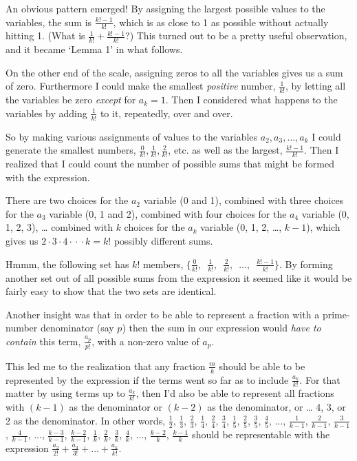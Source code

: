 \documentclass{article}
\begin{document}
An obvious pattern emerged!
By assigning the largest possible values to the variables,
the sum is \(\frac{k!-1}{k!}\),
which is as close to 1 as possible without actually
hitting 1. (What is \(\frac{1}{k!} + \frac{k!-1}{k!}\)?)
This turned out to be
a pretty useful observation, and it became `Lemma 1' in what follows.

On the other end of the scale, assigning zeros to all the variables 
gives us a sum of zero.
Furthermore
I could make
the smallest \emph{positive} number, \(\frac{1}{k!}\), by
letting all the variables be zero \emph{except} for \(a_k = 1\).
Then I considered what happens to the variables by
adding \(\frac{1}{k!}\) to it, repeatedly, over and over.

So by making various assignments of values to
the variables \(a_2, a_3, \dots{}, a_k\) I could
generate the smallest numbers, \(\frac{0}{k!}, \frac{1}{k!}, \frac{2}{k!}\), etc.
as well as the largest,
\(\frac{k!-1}{k!}\).
Then I realized that I could count the number of possible sums that might be formed 
with the expression.

There are two choices for the \(a_2\) variable (0 and 1),
combined with three choices for the \(a_3\) variable (0, 1 and 2),
combined with four choices for the \(a_4\) variable (0, 1, 2, 3),
\dots{} combined with \(k\) choices for
the \(a_k\) variable (0, 1, 2, \dots{}, \(k\!-\!1\)), which
gives us \(2\cdot{}3\cdot{}4\cdot{}\cdot{}\cdot{}k = k!\) possibly different sums.

Hmmm, the following set has \(k!\) members,
\(\{\frac{0}{k!},\enspace \frac{1}{k!},\enspace \frac{2}{k!},
\enspace \dots{},\enspace \frac{k!-1}{k!}\}\).
By forming another set out of all possible sums from the expression
it seemed like it would be fairly easy to show that the two sets are identical.

Another insight was that in order to be able to represent
a fraction with a prime-number denominator (say \(p\))
then the sum in our
expression would \emph{have to contain} this term,
\(\frac{a_p}{p!}\),
with a non-zero value of \(a_p\).

This led me to the realization that any fraction \(\frac{m}{k}\)
should be able to be represented by the expression
if the terms went so far as to include \(\frac{a_k}{k!}\). For that
matter by using terms up to \(\frac{a_k}{k!}\), then I'd
also be able to represent all fractions with
\((k-1)\) as the denominator or 
\((k-2)\) as the denominator, or \dots{}
4, 3, or 2 as the denominator. In other words,
\(\frac{1}{2}\),
\(\frac{1}{3}\),
\(\frac{2}{3}\),
\(\frac{1}{4}\),
\(\frac{2}{4}\),
\(\frac{3}{4}\),
\(\frac{1}{5}\),
\(\frac{2}{5}\),
\(\frac{3}{5}\),
\(\frac{4}{5}\),
\(\dots{}\),
\(\frac{1}{k-1}\),
\(\frac{2}{k-1}\),
\(\frac{3}{k-1}\),
\(\frac{4}{k-1}\),
\(\dots{}\),
\(\frac{k-3}{k-1}\),
\(\frac{k-2}{k-1}\),
\(\frac{1}{k}\),
\(\frac{2}{k}\),
\(\frac{3}{k}\),
\(\frac{4}{k}\),
\(\dots{}\),
\(\frac{k-2}{k}\),
\(\frac{k-1}{k}\)
should be
representable with the expression 
\(\frac{a_2}{2!} + \frac{a_3}{3!} + \dots{} + \frac{a_k}{k!}\). 
\end{document}
